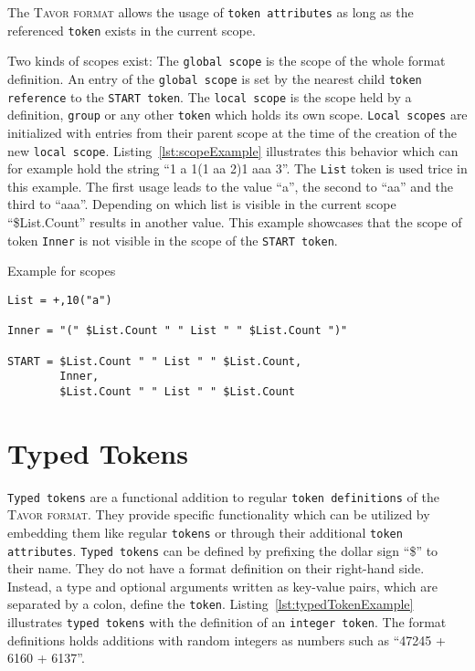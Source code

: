 The \textsc{Tavor format} allows the usage of \texttt{token attributes} as long as the referenced \texttt{token} exists in the current scope.

Two kinds of scopes exist: The \texttt{global scope} is the scope of the whole format definition. An entry of the \texttt{global scope} is set by the nearest child \texttt{token reference} to the \texttt{START token}. The \texttt{local scope} is the scope held by a definition, \texttt{group} or any other \texttt{token} which holds its own scope. \texttt{Local scopes} are initialized with entries from their parent scope at the time of the creation of the new \texttt{local scope}. Listing~\ref{lst:scopeExample} illustrates this behavior which can for example hold the string \enquote{1 a 1(1 aa 2)1 aaa 3}. The \texttt{List} token is used trice in this example. The first usage leads to the value \enquote{a}, the second to \enquote{aa} and the third to \enquote{aaa}. Depending on which list is visible in the current scope \enquote{\$List.Count} results in another value. This example showcases that the scope of token \texttt{Inner} is not visible in the scope of the \texttt{START token}.

\begin{listing}
\caption{Example for scopes}
\label{lst:scopeExample}
\begin{verbatim}
List = +,10("a")

Inner = "(" $List.Count " " List " " $List.Count ")"

START = $List.Count " " List " " $List.Count,
        Inner,
        $List.Count " " List " " $List.Count
\end{verbatim}
\end{listing}

\section{Typed Tokens}
\label{sec:typedTokens}

\texttt{Typed tokens} are a functional addition to regular \texttt{token definitions} of the \textsc{Tavor format}. They provide specific functionality which can be utilized by embedding them like regular \texttt{tokens} or through their additional \texttt{token attributes}. \texttt{Typed tokens} can be defined by prefixing the dollar sign \enquote{\$} to their name. They do not have a format definition on their right-hand side. Instead, a type and optional arguments written as key-value pairs, which are separated by a colon, define the \texttt{token}. Listing~\ref{lst:typedTokenExample} illustrates \texttt{typed tokens} with the definition of an \texttt{integer token}. The format definitions holds additions with random integers as numbers such as \enquote{47245 + 6160 + 6137}.

